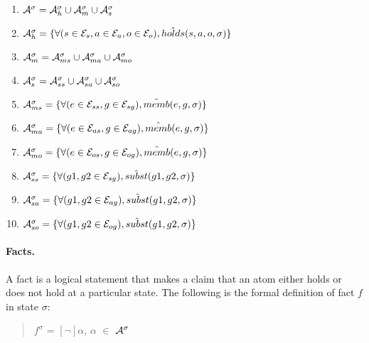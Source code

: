 \documentclass[10pt, twocolumn]{article}
\begin{document}
          \begin{enumerate}
            \item
              ${\cal A}^{\sigma} = {\cal A}^{\sigma}_{h} \cup {\cal A}^{\sigma}_{m} \cup {\cal A}^{\sigma}_{s}$
            \item
              ${\cal A}^{\sigma}_{h} = \{\forall (s \in {\cal E}_{s}, a \in {\cal E}_{a}, o \in {\cal E}_{o}), \hat{holds}(s, a, o, \sigma) \}$
            \item
              ${\cal A}^{\sigma}_{m} = {\cal A}^{\sigma}_{ms} \cup {\cal A}^{\sigma}_{ma} \cup {\cal A}^{\sigma}_{mo}$
            \item
              ${\cal A}^{\sigma}_{s} = {\cal A}^{\sigma}_{ss} \cup {\cal A}^{\sigma}_{sa} \cup {\cal A}^{\sigma}_{so}$
            \item
              ${\cal A}^{\sigma}_{ms} = \{\forall (e \in {\cal E}_{ss}, g \in {\cal E}_{sg}), \hat{memb}(e, g, \sigma)\}$
            \item
              ${\cal A}^{\sigma}_{ma} = \{\forall (e \in {\cal E}_{as}, g \in {\cal E}_{ag}), \hat{memb}(e, g, \sigma)\}$
            \item
              ${\cal A}^{\sigma}_{mo} = \{\forall (e \in {\cal E}_{os}, g \in {\cal E}_{og}), \hat{memb}(e, g, \sigma)\}$
            \item
              ${\cal A}^{\sigma}_{ss} = \{\forall (g1, g2 \in {\cal E}_{sg}), \hat{subst}(g1, g2, \sigma)\}$
            \item
              ${\cal A}^{\sigma}_{sa} = \{\forall (g1, g2 \in {\cal E}_{ag}), \hat{subst}(g1, g2, \sigma)\}$
            \item
              ${\cal A}^{\sigma}_{so} = \{\forall (g1, g2 \in {\cal E}_{og}), \hat{subst}(g1, g2, \sigma)\}$
          \end{enumerate}

        \paragraph{Facts.}

          A fact is a logical statement that makes a claim that an atom either
          holds or does not hold at a particular state. The following is the
          formal definition of fact $f$ in state $\sigma$:

          \begin{quote}
            $f^{\sigma}$ = $[\lnot]$$\alpha$, $\alpha$ $\in$ ${\cal A}^{\sigma}$
          \end{quote}
\end{document}
